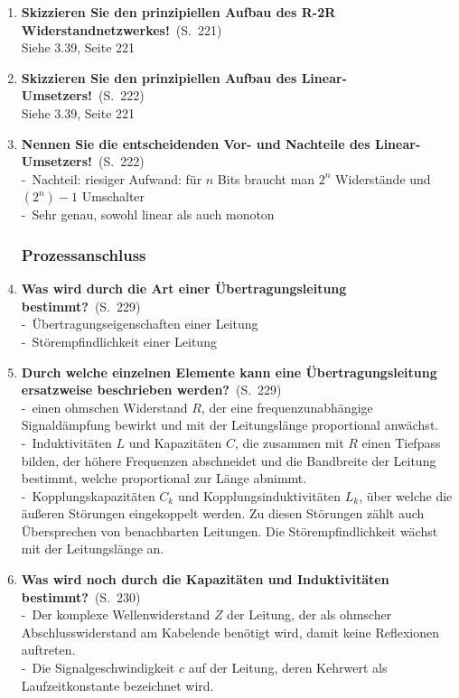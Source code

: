 \documentclass[a4paper,12pt]{article}
\newcommand{\question}[3]{\pagebreak[3]\item {\textbf{#1?}}\ (S.\ #2)#3}
\newcommand{\statement}[3]{\pagebreak[3]\item {\textbf{#1!}}\ (S.\ #2)#3}
\newcommand{\catchword}[1]{\\-\ #1}
\newcommand{\normaltext}[1]{\\#1}
\newcommand{\page}[1]{#1}
\begin{document}
\begin{enumerate}
  \statement{Skizzieren Sie den prinzipiellen Aufbau des R-2R Widerstandnetzwerkes}{\page{221}}
  {
    \normaltext{Siehe  3.39, Seite 221}
  }

  \statement{Skizzieren Sie den prinzipiellen Aufbau des Linear-Umsetzers}{\page{222}}
  {
    \normaltext{Siehe \index{Bild} 3.39, Seite 221}
  }

  \statement{Nennen Sie die entscheidenden Vor- und Nachteile des Linear-Umsetzers}{\page{222}}
  {
    \catchword{Nachteil: riesiger Aufwand: für $n$ Bits braucht man $2^n$ Widerstände und
               $(2^n)-1$ Umschalter}
    \catchword{Sehr genau, sowohl linear als auch monoton}
  }

  \subsubsection{Prozessanschluss}

  \question{Was wird durch die Art einer Übertragungsleitung bestimmt}{\page{229}}
  {
    \catchword{Übertragungseigenschaften einer Leitung}
    \catchword{Störempfindlichkeit einer Leitung}
  }

  \question{Durch welche einzelnen Elemente kann eine Übertragungsleitung ersatzweise
            beschrieben werden}{\page{229}}
  {
    \catchword{einen ohmschen Widerstand $R$, der eine frequenzunabhängige Signaldämpfung bewirkt und
               mit der Leitungslänge proportional anwächst.}
    \catchword{Induktivitäten $L$ und Kapazitäten $C$, die zusammen mit $R$ einen Tiefpass bilden,
               der höhere Frequenzen abschneidet und die Bandbreite der Leitung bestimmt, welche
               proportional zur Länge abnimmt.}
    \catchword{Kopplungskapazitäten $C_k$ und Kopplungsinduktivitäten $L_k$, über welche die äußeren
               Störungen eingekoppelt werden. Zu diesen Störungen zählt auch Übersprechen von benachbarten
               Leitungen. Die Störempfindlichkeit wächst mit der Leitungslänge an.}
  }

  \question{Was wird noch durch die Kapazitäten und Induktivitäten bestimmt}{\page{230}}
  {
    \catchword{Der komplexe Wellenwiderstand $Z$ der Leitung, der als ohmscher Abschlusswiderstand
               am Kabelende benötigt wird, damit keine Reflexionen auftreten.}
    \catchword{Die Signalgeschwindigkeit $c$ auf der Leitung, deren Kehrwert als Laufzeitkonstante
               bezeichnet wird.}
  }


\end{enumerate}
\end{document}
